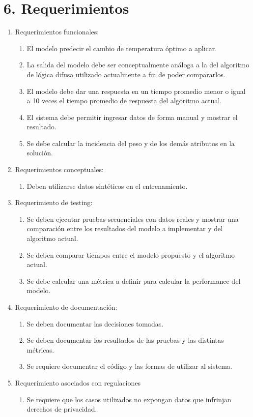 \documentclass[
11pt, %
]{charter}
\begin{document}
\section{6. Requerimientos}
\label{sec:requerimientos}

\begin{enumerate}
	\item Requerimientos funcionales:
		\begin{enumerate}
			\item El modelo predecir el cambio de temperatura óptimo a aplicar.
			\item La salida del modelo debe ser conceptualmente análoga a la del algoritmo de lógica difusa utilizado actualmente a fin de poder compararlos.
			\item El modelo debe dar una respuesta en un tiempo promedio menor o igual a 10 veces el tiempo promedio de respuesta del algoritmo actual.
			\item El sistema debe permitir ingresar datos de forma manual y mostrar el resultado.
			\item Se debe calcular la incidencia del peso y de los demás atributos en la solución.
		\end{enumerate}
	\item Requerimientos conceptuales:
		\begin{enumerate}
			\item Deben utilizarse datos sintéticos en el entrenamiento.
		\end{enumerate}
	\item Requerimiento de testing:
		\begin{enumerate}
			\item Se deben ejecutar pruebas secuenciales con datos reales y mostrar una comparación entre los resultados del modelo a implementar y del algoritmo actual.
			\item Se deben comparar tiempos entre el modelo propuesto y el algoritmo actual.
			\item Se debe calcular una métrica a definir para calcular la performance del modelo.
		\end{enumerate}
	\item Requerimiento de documentación:
		\begin{enumerate}
			\item Se deben documentar las decisiones tomadas.
			\item Se deben documentar los resultados de las pruebas y las distintas métricas.
			\item Se requiere documentar el código y las formas de utilizar al sistema.
		\end{enumerate}
	\item Requerimiento asociados con regulaciones
		\begin{enumerate}
			\item Se requiere que los casos utilizados no expongan datos que infrinjan derechos de privacidad.
		\end{enumerate}
\end{enumerate}
\end{document}
